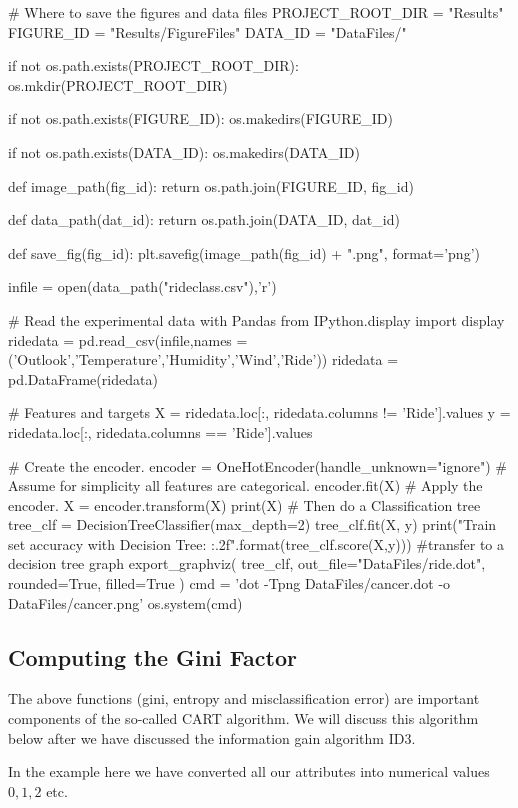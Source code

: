\documentclass[%
oneside,                 %
final,                   %
10pt]{article}
\begin{document}
# Where to save the figures and data files
PROJECT_ROOT_DIR = "Results"
FIGURE_ID = "Results/FigureFiles"
DATA_ID = "DataFiles/"

if not os.path.exists(PROJECT_ROOT_DIR):
    os.mkdir(PROJECT_ROOT_DIR)

if not os.path.exists(FIGURE_ID):
    os.makedirs(FIGURE_ID)

if not os.path.exists(DATA_ID):
    os.makedirs(DATA_ID)

def image_path(fig_id):
    return os.path.join(FIGURE_ID, fig_id)

def data_path(dat_id):
    return os.path.join(DATA_ID, dat_id)

def save_fig(fig_id):
    plt.savefig(image_path(fig_id) + ".png", format='png')

infile = open(data_path("rideclass.csv"),'r')

# Read the experimental data with Pandas
from IPython.display import display
ridedata = pd.read_csv(infile,names = ('Outlook','Temperature','Humidity','Wind','Ride'))
ridedata = pd.DataFrame(ridedata)

# Features and targets
X = ridedata.loc[:, ridedata.columns != 'Ride'].values
y = ridedata.loc[:, ridedata.columns == 'Ride'].values

# Create the encoder.
encoder = OneHotEncoder(handle_unknown="ignore")
# Assume for simplicity all features are categorical.
encoder.fit(X)    
# Apply the encoder.
X = encoder.transform(X)
print(X)
# Then do a Classification tree
tree_clf = DecisionTreeClassifier(max_depth=2)
tree_clf.fit(X, y)
print("Train set accuracy with Decision Tree: {:.2f}".format(tree_clf.score(X,y)))
#transfer to a decision tree graph
export_graphviz(
    tree_clf,
    out_file="DataFiles/ride.dot",
    rounded=True,
    filled=True
)
cmd = 'dot -Tpng DataFiles/cancer.dot -o DataFiles/cancer.png'
os.system(cmd)


\epycod

\subsection{Computing the Gini Factor}

The above functions (gini, entropy and misclassification error) are
important components of the so-called CART algorithm. We will discuss
this algorithm below after we have discussed the information gain
algorithm ID3.

In the example here we have converted all our attributes into numerical values $0,1,2$ etc.
\end{document}
